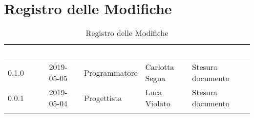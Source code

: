 \newpage

\section*{Registro delle Modifiche}

\begin{center}
\begin{longtable}[c]{|m{}|m{}|m{}|m{}|p{}|}
\hline
\rowcolor{bluelogo}\textbf{\textcolor{white}{Versione}} & \textbf{\textcolor{white}{Data}} & \textbf{\textcolor{white}{Ruolo}} & \textbf{\textcolor{white}{Autore}} & \textbf{\textcolor{white}{Descrizione}}\\
\hline \hline
\endfirsthead
\rowcolor{grigio} 0.1.0 & 2019-05-05 & Programmatore & Carlotta Segna & Stesura documento \\
\hline
0.0.1 & 2019-05-04 & Progettista & Luca Violato & Stesura documento \\
\hline
\caption{Registro delle Modifiche}
\end{longtable}
\end{center}
